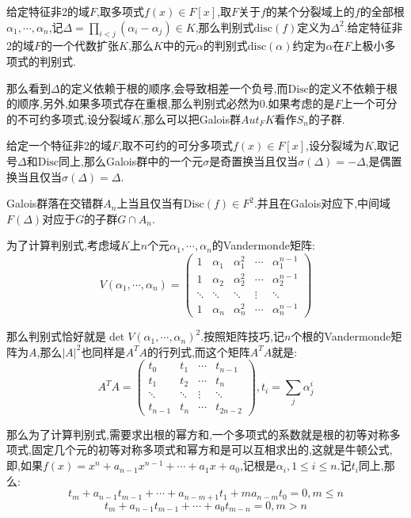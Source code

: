 给定特征非2的域$F$,取多项式$f(x)\in F[x]$,取$F$关于$f$的某个分裂域上的$f$的全部根$\alpha_1,\cdots,\alpha_n$,记$\Delta=\prod_ {i<j}(\alpha_i-\alpha_j)\in K$,那么判别式$\mathrm{disc}(f)$定义为$\Delta^2$.给定特征非2的域$F$的一个代数扩张$K$,那么$K$中的元$\alpha$的判别式$\mathrm{disc}(\alpha)$约定为$\alpha$在$F$上极小多项式的判别式.

那么看到$\Delta$的定义依赖于根的顺序,会导致相差一个负号,而$\mathrm{Disc}$的定义不依赖于根的顺序,另外,如果多项式存在重根,那么判别式必然为0.如果考虑的是$F$上一个可分的不可约多项式,设分裂域$K$,那么可以把Galois群$Aut_FK$看作$S_n$的子群.

给定一个特征非2的域$F$,取不可约的可分多项式$f(x)\in F[x]$,设分裂域为$K$,取记号$\Delta$和$\mathrm{Disc}$同上,那么Galois群中的一个元$\sigma$是奇置换当且仅当$\sigma(\Delta)=-\Delta$,是偶置换当且仅当$\sigma(\Delta)=\Delta$.

Galois群落在交错群$A_n$上当且仅当有$\mathrm{Disc}(f)\in F^2$.并且在Galois对应下,中间域$F(\Delta)$对应于$G$的子群$G\cap A_n$.

为了计算判别式,考虑域$K$上$n$个元$\alpha_1,\cdots,\alpha_n$的Vandermonde矩阵:
$$V(\alpha_1,\cdots,\alpha_n)=\left(\begin{array}{ccccc}
1&\alpha_1&\alpha_1^2&\cdots&\alpha_1^{n-1}\\
1&\alpha_2&\alpha_2^2&\cdots&\alpha_2^{n-1}\\
\ddots&\ddots&\ddots&\vdots&\ddots\\
1&\alpha_n&\alpha_n^2&\cdots&\alpha_n^{n-1}
\end{array}\right)$$

那么判别式恰好就是$\det V(\alpha_1,\cdots,\alpha_n)^2$.按照矩阵技巧,记$n$个根的Vandermonde矩阵为$A$,那么$|A|^2$也同样是$A^TA$的行列式,而这个矩阵$A^TA$就是:
$$A^TA=\left(\begin{array}{cccc}
t_0&t_1&\cdots&t_{n-1}\\
t_1&t_2&\cdots&t_{n}\\
\ddots&\ddots&\vdots&\ddots\\
t_{n-1}&t_n&\cdots&t_{2n-2}
\end{array}\right),t_i=\sum_j\alpha_j^i$$

那么为了计算判别式,需要求出根的幂方和,一个多项式的系数就是根的初等对称多项式,固定几个元的初等对称多项式和幂方和是可以互相求出的,这就是牛顿公式,即,如果$f(x)=x^n+a_{n-1}x^{n-1}+\cdots+a_1x+a_0$,记根是$\alpha_i,1\le i\le n$.记$t_i$同上,那么:
$$t_m+a_{n-1}t_{m-1}+\cdots+a_{n-m+1}t_1+ma_{n-m}t_0=0,m\le n$$
$$t_m+a_{n-1}t_{m-1}+\cdots+a_0t_{m-n}=0,m>n$$

